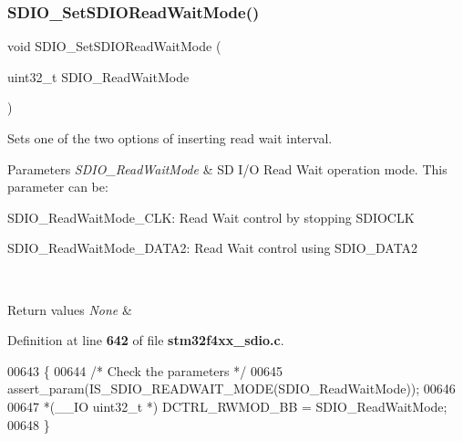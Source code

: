 \subsubsection{S\+D\+I\+O\+\_\+\+Set\+S\+D\+I\+O\+Read\+Wait\+Mode()}
{\footnotesize\ttfamily void S\+D\+I\+O\+\_\+\+Set\+S\+D\+I\+O\+Read\+Wait\+Mode (\begin{DoxyParamCaption}\item[{uint32\+\_\+t}]{S\+D\+I\+O\+\_\+\+Read\+Wait\+Mode }\end{DoxyParamCaption})}



Sets one of the two options of inserting read wait interval. 


\begin{DoxyParams}{Parameters}
{\em S\+D\+I\+O\+\_\+\+Read\+Wait\+Mode} & SD I/O Read Wait operation mode. This parameter can be\+: \begin{DoxyItemize}
\item S\+D\+I\+O\+\_\+\+Read\+Wait\+Mode\+\_\+\+C\+LK\+: Read Wait control by stopping S\+D\+I\+O\+C\+LK \item S\+D\+I\+O\+\_\+\+Read\+Wait\+Mode\+\_\+\+D\+A\+T\+A2\+: Read Wait control using S\+D\+I\+O\+\_\+\+D\+A\+T\+A2 \end{DoxyItemize}
\\
\hline
\end{DoxyParams}

\begin{DoxyRetVals}{Return values}
{\em None} & \\
\hline
\end{DoxyRetVals}


Definition at line \textbf{ 642} of file \textbf{ stm32f4xx\+\_\+sdio.\+c}.


\begin{DoxyCode}
00643 \{
00644   \textcolor{comment}{/* Check the parameters */}
00645   assert_param(IS_SDIO_READWAIT_MODE(SDIO\_ReadWaitMode));
00646   
00647   *(\_\_IO uint32\_t *) DCTRL_RWMOD_BB = SDIO\_ReadWaitMode;
00648 \}
\end{DoxyCode}
\mbox{\label{group__SDIO__Group4_gac88f914d9a68a83abc2265ec8a7b79fc}} 
